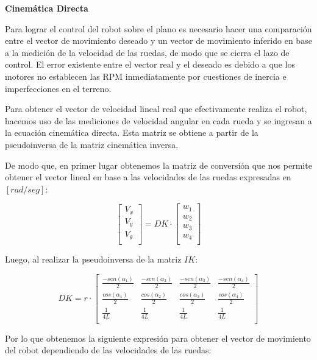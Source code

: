 \textbf{Cinemática Directa} \mbox{} \vspace{8pt}

Para lograr el control del robot sobre el plano es necesario hacer una comparación entre el vector de movimiento deseado y un vector de movimiento inferido en base a la medición de la velocidad de las ruedas, de modo que se cierra el lazo de control. El error existente entre el vector real y el deseado es debido a que los motores no establecen las RPM inmediatamente por cuestiones de inercia e imperfecciones en el terreno.

Para obtener el vector de velocidad lineal real que efectivamente realiza el robot, hacemos uso de las mediciones de velocidad angular en cada rueda y se ingresan a la ecuación cinemática directa. Esta matriz se obtiene a partir de la pseudoinversa de la matriz cinemática inversa. \cite{islassistcontrolomni}

De modo que, en primer lugar obtenemos la matriz de conversión que nos permite obtener el vector lineal en base a las velocidades de las ruedas expresadas en $[rad/seg]$:

$$ \begin{bmatrix} V_x \\ V_y \\ V_\theta \\ \end{bmatrix} = DK \cdot \begin{bmatrix} w_1 \\ w_2 \\ w_3 \\ w_4 \\ \end{bmatrix} $$

Luego, al realizar la pseudoinversa de la matriz $IK$:

$$  DK = 
    r
    \cdot 
    \begin{bmatrix}
        {\frac{-sen(\alpha_1)}{2}} & {\frac{-sen(\alpha_2)}{2}} & {\frac{-sen(\alpha_3)}{2}} & {\frac{-sen(\alpha_4)}{2}} \\
        {\frac{cos(\alpha_1)}{2}}  & {\frac{cos(\alpha_2)}{2}}  & {\frac{cos(\alpha_3)}{2}}  & {\frac{cos(\alpha_4)}{2}}  \\
        {\frac{1}{4L}}  & {\frac{1}{4L}}  & {\frac{1}{4L}}  & {\frac{1}{4L}}  \\
    \end{bmatrix} $$

Por lo que obtenemos la siguiente expresión para obtener el vector de movimiento del robot dependiendo de las velocidades de las ruedas:

